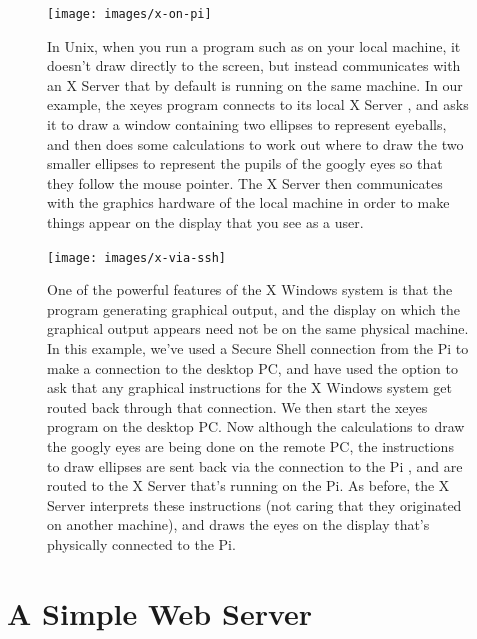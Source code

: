 \begin{figure}
\centerline{\texttt{[image: images/x-on-pi]}}
\caption{In Unix, when you run a program such as  on your local machine, it doesn't draw directly to the screen, but instead communicates with an X Server that by default is running on the same machine. In our example, the xeyes program \protect{} connects to its local X Server \protect{}, and asks it to draw a window containing two ellipses to represent eyeballs, and then does some calculations to work out where to draw the two smaller ellipses to represent the pupils of the googly eyes so that they follow the mouse pointer. The X Server then communicates with the graphics hardware of the local machine in order to make things appear on the display that you see as a user. }\label{figure:x-on-pi}
\end{figure}

\begin{figure}
\centerline{\texttt{[image: images/x-via-ssh]}}
\caption{One of the powerful features of the X Windows system is that the program generating graphical output, and the display on which the graphical output appears need not be on the same physical machine. In this example, we've used a Secure Shell connection from the Pi \protect{} to make a connection to the desktop PC, and have used the  option to ask that any graphical instructions for the X Windows system get routed back through that connection. We then start the xeyes program on the desktop PC. Now although the calculations to draw the googly eyes are being done on the remote PC, the instructions to draw ellipses are sent back via the  connection to the Pi  \protect{}, and are \protect{} routed to the X Server that's running on the Pi. As before, the X Server \protect{} interprets these instructions (not caring that they originated on another machine), and draws the eyes on the display that's physically connected to the Pi.}\label{figure:x-via-ssh}
\end{figure}





\section{A Simple Web Server}

